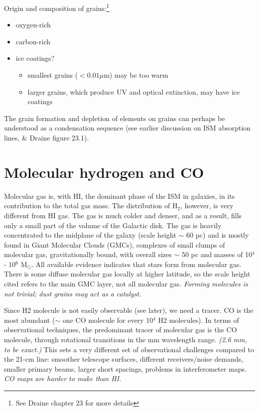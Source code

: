 \documentclass[11pt]{article}
\newcommand{\mar}[1]{\hspace{0pt}\marginpar{-\textcolor{black}{#1}-}}
\newcommand{\mynotes}[1]{{\fontfamily{cmss}\selectfont \textit{#1}}}
\begin{document}
Origin and composition of grains:\footnote{
    See Draine chapter 23 for more details}
\begin{itemize}
    \item oxygen-rich
    \item carbon-rich
    \item ice coatings?
        \begin{itemize}
            \item smallest grains ($<0.01\mu$m) may be too warm
            \item larger grains, which produce UV and optical extinction,
                may have ice coatings
        \end{itemize}
\end{itemize}
The grain formation and depletion of elements on grains can perhaps be
understood as a condensation sequence (see earlier discussion on
ISM absorption lines, \& Draine figure 23.1).

\newpage
\section{Molecular hydrogen and CO}
\mar{124}Molecular gas is, with HI, the dominant phase of the ISM in galaxies,
in its contribution to the total gas mass. The distribution of H$_{2}$, however,
is very different from HI gas. The gas is much colder and denser, and as a
result, fills only a small part of the volume of the Galactic disk. The gas
is heavily concentrated to the midplane of the galaxy (scale height $\sim$ 60
pc) and is mostly found in Giant Molecular Clouds (GMCs), complexes of small
clumps of molecular gas, gravitationally bound, with overall sizes $\sim$ 50
pc and masses of 10$^{4}$ - 10$^{6}$ M$_{\odot}$. All available evidence
indicates that stars form from molecular gas. There is some diffuse
molecular gas locally at higher latitude, so the scale height cited refers
to the main GMC layer, not all molecular gas.
\mynotes{Forming molecules is not trivial; dust grains may act as a catalyst.}

Since H2 molecule is not
easily observable (see later), we need a tracer. CO is the most abundant
($\sim$ one CO molecule for every 10$^{4}$ H2 molecules). In terms of
observational techniques, the predominant tracer of molecular gas is the
CO molecule, through rotational transitions in the mm wavelength range.
\mynotes{(2.6 mm, to be exact.)}
This sets a very different set of observational challenges compared to the
21-cm line: smoother telescope surfaces, different receivers/noise demands,
smaller primary beams, larger short spacings, problems in interferometer
maps. \mynotes{CO maps are harder to make than HI.}
\end{document}
